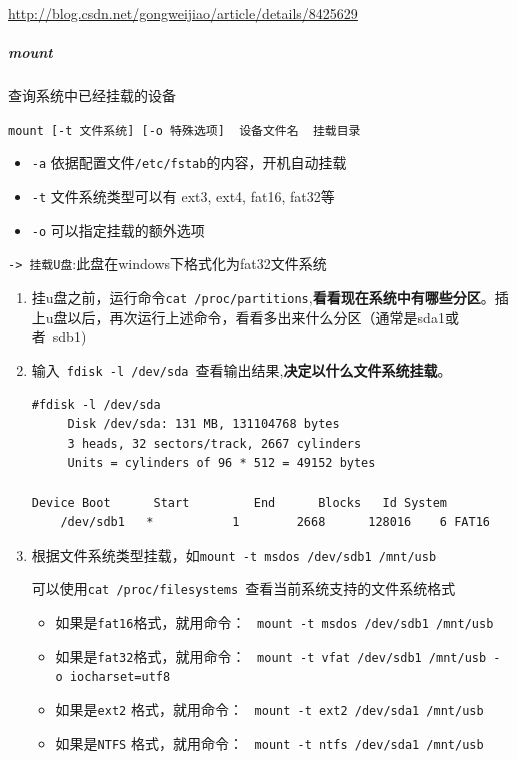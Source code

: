 \documentclass[UTF8,a4paper,12pt]{ctexbook}
\begin{document}
			\url{http://blog.csdn.net/gongweijiao/article/details/8425629}
		\subparagraph{mount}查询系统中已经挂载的设备
		
			\verb|mount [-t 文件系统] [-o 特殊选项]  设备文件名  挂载目录|
			
			\begin{itemize}
				\item \verb|-a| 依据配置文件\verb|/etc/fstab|的内容，开机自动挂载
				\item \verb|-t| 文件系统类型可以有 ext3, ext4, fat16, fat32等
				\item \verb|-o| 可以指定挂载的额外选项
			\end{itemize}
		
			\verb|-> 挂载U盘|:此盘在windows下格式化为fat32文件系统
				\begin{enumerate}
					\item 挂u盘之前，运行命令\verb|cat /proc/partitions|,\textbf{看看现在系统中有哪些分区}。插上u盘以后，再次运行上述命令，看看多出来什么分区（通常是sda1或者 sdb1)
					
					\item 输入 \verb|fdisk -l /dev/sda| 查看输出结果,\textbf{决定以什么文件系统挂载}。
					\begin{lstlisting}[frame=L,xleftmargin=.1\textwidth]
	#fdisk -l /dev/sda 
	 Disk /dev/sda: 131 MB, 131104768 bytes      
	 3 heads, 32 sectors/track, 2667 cylinders      
	 Units = cylinders of 96 * 512 = 49152 bytes 
	 Device Boot      Start         End      Blocks   Id System     
	/dev/sdb1   *           1        2668      128016    6 FAT16
					\end{lstlisting}
					
					\item 根据文件系统类型挂载，如\verb|mount -t msdos /dev/sdb1 /mnt/usb|
					
					可以使用\verb|cat /proc/filesystems |查看当前系统支持的文件系统格式
						\begin{itemize}
							\item 如果是\verb|fat16|格式，就用命令：  \verb|mount -t msdos /dev/sdb1 /mnt/usb| 
							\item 如果是\verb|fat32|格式，就用命令： 	\verb|mount -t vfat /dev/sdb1 /mnt/usb -o iocharset=utf8 |
							\item 如果是\verb|ext2| 格式，就用命令：  \verb|mount -t ext2 /dev/sda1 /mnt/usb|
							\item 如果是\verb|NTFS| 格式，就用命令：  \verb|mount -t ntfs /dev/sda1 /mnt/usb|
						\end{itemize}
				\end{enumerate}
				
\end{document}
